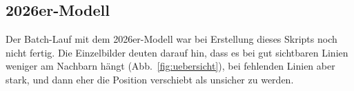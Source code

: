 \subsection{2026er-Modell }
Der Batch-Lauf mit dem 2026er-Modell war bei Erstellung dieses Skripts noch nicht fertig. Die
Einzelbilder deuten darauf hin, dass es bei gut sichtbaren Linien weniger am Nachbarn hängt
(Abb.~\ref{fig:uebersicht}), bei fehlenden Linien aber stark, und dann eher die Position
verschiebt als unsicher zu werden.
